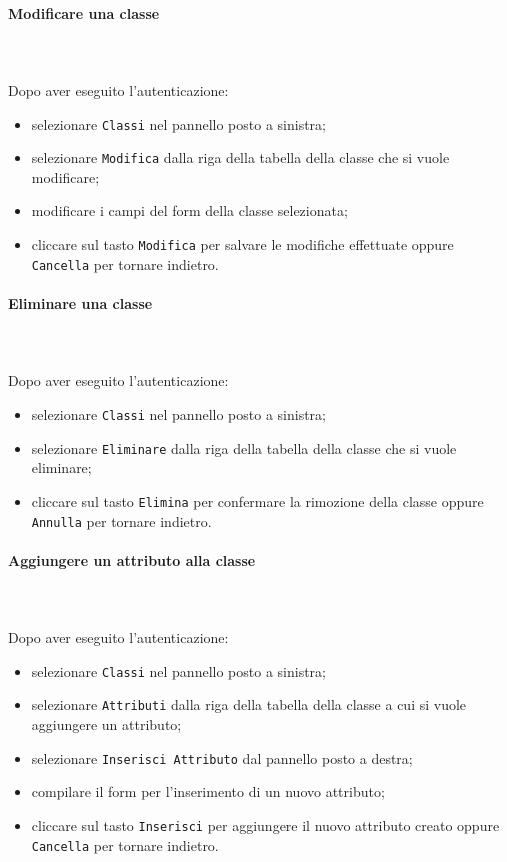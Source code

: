	\paragraph{Modificare una classe} \mbox{}\\ \mbox{}\\
	Dopo aver eseguito l'autenticazione:
	\begin{itemize}
		\item selezionare \texttt{Classi} nel pannello posto a sinistra;
		\item selezionare \texttt{Modifica} dalla riga della tabella della classe
		che si vuole modificare;
		\item modificare i campi del form della classe selezionata;
		\item cliccare sul tasto \texttt{Modifica} per salvare le modifiche effettuate
		oppure \texttt{Cancella} per tornare indietro.
	\end{itemize}
	
	\paragraph{Eliminare una classe} \mbox{}\\ \mbox{}\\
	Dopo aver eseguito l'autenticazione:
	\begin{itemize}
		\item selezionare \texttt{Classi} nel pannello posto a sinistra;
		\item selezionare \texttt{Eliminare} dalla riga della tabella della classe
		che si vuole eliminare;
		\item cliccare sul tasto \texttt{Elimina} per confermare la rimozione della classe
		oppure \texttt{Annulla} per tornare indietro.
	\end{itemize}
	
	\paragraph{Aggiungere un attributo alla classe} \mbox{}\\ \mbox{}\\
	Dopo aver eseguito l'autenticazione:
	\begin{itemize}
		\item selezionare \texttt{Classi} nel pannello posto a sinistra;
		\item selezionare \texttt{Attributi} dalla riga della tabella della classe
		a cui si vuole aggiungere un attributo;
		\item selezionare \texttt{Inserisci Attributo} dal pannello posto a destra;
		\item compilare il form per l'inserimento di un nuovo attributo;
		\item cliccare sul tasto \texttt{Inserisci} per aggiungere il nuovo attributo 
		creato oppure \texttt{Cancella} per tornare indietro.	
	\end{itemize}
	
